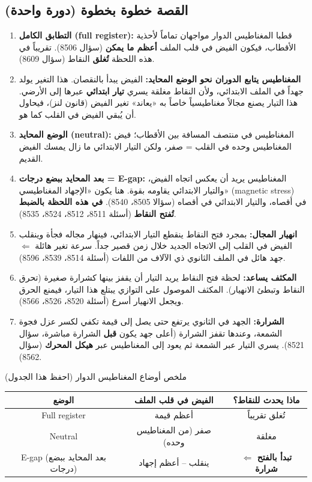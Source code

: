 \documentclass[11pt,a4paper]{article}
\newcommand{\en}[1]{\textenglish{#1}}
\begin{document}
\subsection{القصة خطوة بخطوة (دورة واحدة)}
\begin{enumerate}[label=\textbf{الخطوة \arabic*:},leftmargin=*]
  \item \textbf{التطابق الكامل (\en{full register}):} قطبا المغناطيس الدوار مواجهان تماماً لأحذية الأقطاب، فيكون الفيض في قلب الملف \textbf{أعظم ما يمكن} (سؤال 8506). تقريباً في هذه اللحظة \textbf{تُغلق} النقاط (سؤال 8609).
  \item \textbf{المغناطيس يتابع الدوران نحو الوضع المحايد:} الفيض يبدأ بالنقصان. هذا التغير يولد جهداً في الملف الابتدائي، ولأن النقاط مغلقة يسري \textbf{تيار ابتدائي} عبرها إلى الأرضي. هذا التيار يصنع مجالاً مغناطيسياً خاصاً به «يعاند» تغير الفيض (قانون لنز)، فيحاول أن يُبقي الفيض في القلب كما هو.
  \item \textbf{الوضع المحايد (\en{neutral}):} المغناطيس في منتصف المسافة بين الأقطاب؛ فيض المغناطيس وحده في القلب = صفر، ولكن التيار الابتدائي ما زال يمسك الفيض القديم.
  \item \textbf{بعد المحايد ببضع درجات = \en{E-gap}:} المغناطيس يريد أن يعكس اتجاه الفيض، والتيار الابتدائي يقاومه بقوة. هنا يكون «الإجهاد المغناطيسي» (\en{magnetic stress}) في أقصاه، والتيار الابتدائي في أقصاه (سؤالا 8505، 8540). \textbf{في هذه اللحظة بالضبط تُفتح النقاط} (أسئلة 8511، 8512، 8524، 8535).
  \item \textbf{انهيار المجال:} بمجرد فتح النقاط ينقطع التيار الابتدائي، فينهار مجاله فجأة وينقلب الفيض في القلب إلى الاتجاه الجديد خلال زمن قصير جداً. سرعة تغير هائلة $\Leftarrow$ جهد هائل في الملف الثانوي ذي الآلاف من اللفات (أسئلة 8514، 8539، 8596).
  \item \textbf{المكثف يساعد:} لحظة فتح النقاط يريد التيار أن يقفز بينها كشرارة صغيرة (تحرق النقاط وتبطئ الانهيار). المكثف الموصول على التوازي يبتلع هذا التيار، فيمنع الحرق ويجعل الانهيار أسرع (أسئلة 8520، 8526، 8566).
  \item \textbf{الشرارة:} الجهد في الثانوي يرتفع حتى يصل إلى قيمة تكفي لكسر عزل فجوة الشمعة، وعندها تقفز الشرارة (أعلى جهد يكون \textbf{قبل} الشرارة مباشرة، سؤال 8521). يسري التيار عبر الشمعة ثم يعود إلى المغناطيس عبر \textbf{هيكل المحرك} (سؤال 8562).
\end{enumerate}

\begin{concept}{ملخص أوضاع المغناطيس الدوار (احفظ هذا الجدول)}
\begin{center}
\begin{tabular}{|c|c|c|}
\hline
\textbf{الوضع} & \textbf{الفيض في قلب الملف} & \textbf{ماذا يحدث للنقاط؟}\\\hline
\en{Full register} & أعظم قيمة & تُغلق تقريباً\\\hline
\en{Neutral} & صفر (من المغناطيس وحده) & مغلقة\\\hline
\en{E-gap} (بعد المحايد ببضع درجات) & ينقلب – أعظم إجهاد & \textbf{تبدأ بالفتح $\Leftarrow$ شرارة}\\\hline
\end{tabular}
\end{center}
\end{concept}
\end{document}
